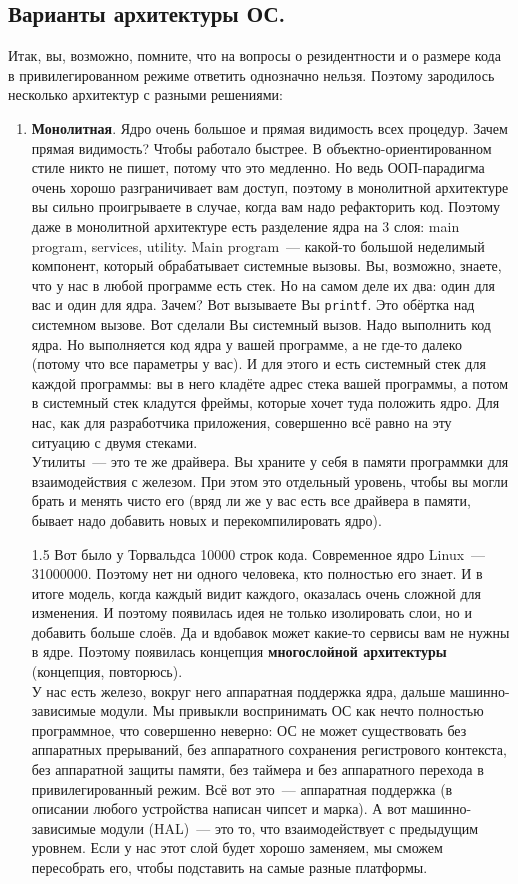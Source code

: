 \documentclass{article}
\begin{document}
    \subsection{Варианты архитектуры ОС.}
    Итак, вы, возможно, помните, что на вопросы о резидентности и о размере кода в привилегированном режиме ответить однозначно нельзя. Поэтому зародилось несколько архитектур с разными решениями:
    \begin{enumerate}
        \item \textbf{Монолитная}. Ядро очень большое и прямая видимость всех процедур. Зачем прямая видимость? Чтобы работало быстрее. В объектно-ориентированном стиле никто не пишет, потому что это медленно. Но ведь ООП-парадигма очень хорошо разграничивает вам доступ, поэтому в монолитной архитектуре вы сильно проигрываете в случае, когда вам надо рефакторить код. Поэтому даже в монолитной архитектуре есть разделение ядра на 3 слоя: main program, services, utility. Main program~--- какой-то большой неделимый компонент, который обрабатывает системные вызовы. Вы, возможно, знаете, что у нас в любой программе есть стек. Но на самом деле их два: один для вас и один для ядра. Зачем? Вот вызываете Вы \texttt{printf}. Это обёртка над системном вызове. Вот сделали Вы системный вызов. Надо выполнить код ядра. Но выполняется код ядра у вашей программе, а не где-то далеко (потому что все параметры у вас). И для этого и есть системный стек для каждой программы: вы в него кладёте адрес стека вашей программы, а потом в системный стек кладутся фреймы, которые хочет туда положить ядро. Для нас, как для разработчика приложения, совершенно всё равно на эту ситуацию с двумя стеками.\\
        Утилиты~--- это те же драйвера. Вы храните у себя в памяти программки для взаимодействия с железом. При этом это отдельный уровень, чтобы вы могли брать и менять чисто его (вряд ли же у вас есть все драйвера в памяти, бывает надо добавить новых и перекомпилировать ядро).
        \item[1.5] Вот было у Торвальдса 10000 строк кода. Современное ядро Linux~--- 31000000. Поэтому нет ни одного человека, кто полностью его знает. И в итоге модель, когда каждый видит каждого, оказалась очень сложной для изменения. И поэтому появилась идея не только изолировать слои, но и добавить больше слоёв. Да и вдобавок может какие-то сервисы вам не нужны в ядре. Поэтому появилась концепция \textbf{многослойной архитектуры} (концепция, повторюсь).\\
        У нас есть железо, вокруг него аппаратная поддержка ядра, дальше машинно-зависимые модули. Мы привыкли воспринимать ОС как нечто полностью программное, что совершенно неверно: ОС не может существовать без аппаратных прерываний, без аппаратного сохранения регистрового контекста, без аппаратной защиты памяти, без таймера и без аппаратного перехода в привилегированный режим. Всё вот это~--- аппаратная поддержка (в описании любого устройства написан чипсет и марка). А вот машинно-зависимые модули (HAL)~--- это то, что взаимодействует с предыдущим уровнем. Если у нас этот слой будет хорошо заменяем, мы сможем пересобрать его, чтобы подставить на самые разные платформы.\\

\end{enumerate}
\end{document}
